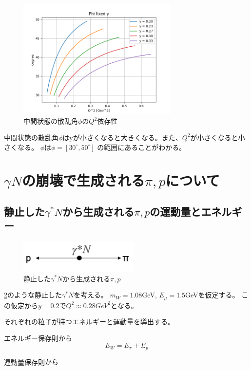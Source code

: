 \begin{figure}[H]
    \centering
    \includegraphics[width=8cm]{img/Phi_degree_fixed_y.png}
    \caption{中間状態の散乱角$\phi$の$Q^2$依存性}
    \label{fig:angle4}
\end{figure}

中間状態の散乱角$\phi$はyが小さくなると大きくなる。また、$Q^2$が小さくなると小さくなる。
$\phi$は$\phi = [30^\circ, 50^\circ]$ の範囲にあることがわかる。

\section{\texorpdfstring{$\gamma N$の崩壊で生成される$\pi, p$について}{LG}}
\subsection{静止した$\gamma^* N$から生成される$\pi,p$の運動量とエネルギー}
\begin{figure}[H]
    \centering
    \includegraphics[width=6cm]{img/rest_middle_situation.png}
    \caption{静止した$\gamma^* N$から生成される$\pi,p$}
    \label{fig:angle5}
\end{figure}
\ref{fig:angle5}のような静止した$\gamma^* N$を考える。
$m_W = 1.08$GeV, $E_\mu = 1.5$GeVを仮定する。
この仮定から$y = 0.2$で$Q^2 \approx 0.28 GeV^2$となる。

それぞれの粒子が持つエネルギーと運動量を導出する。

エネルギー保存則から
\begin{equation}
    \label{eq3_3}
    E_W = E_\pi + E_p
\end{equation}

運動量保存則から

